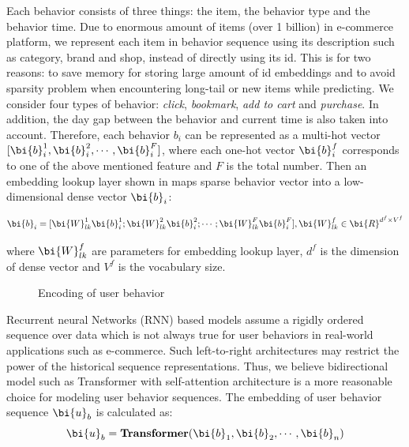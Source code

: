 \noindent
Each behavior consists of three things: the item, the behavior type and the behavior time.
Due to enormous amount of items (over 1 billion) in e-commerce platform, 
we represent each item in behavior sequence 
using its description such as category, brand and shop, instead of directly using its id.
This is for two reasons: to save memory for storing large amount of id embeddings and to avoid sparsity problem when encountering long-tail or new items while predicting.
We consider four types of behavior: \textit{click}, \textit{bookmark}, \textit{add to cart} and \textit{purchase}.
In addition, the day gap between the behavior and current time is also taken into account. 
Therefore, each behavior $b_i$ can be represented as a multi-hot vector 
$[\bi{b}_{i}^{1}, \bi{b}_{i}^{2}, \cdots, \bi{b}_{i}^{F}]$,
where each one-hot vector $\bi{b}_{i}^{f}$ corresponds to one of the above mentioned feature and $F$ is the total number.
Then an embedding lookup layer shown in  maps
sparse behavior vector into a low-dimensional dense vector  $\bi{b}_i$:

\begin{equation}
\label{eqn:lookup}
\bi{b}_i = [\bi{W}_{lk}^{1}\bi{b}_{i}^{1}; \bi{W}_{lk}^{2}\bi{b}_{i}^{2}; \cdots; \bi{W}_{lk}^{F}\bi{b}_{i}^{F}],
\bi{W}_{lk}^{f} \in \bi{R}^{d^{f} \times V^{f}} 
\end{equation}

\noindent
where $\bi{W}_{lk}^{f}$ are parameters for embedding lookup layer,
$d^{f}$ is the dimension of dense vector and $V^{f}$ is the vocabulary size.


\begin{figure}[th]
	\centering
	\caption{Encoding of user behavior}
	\label{fig:detail_2}
\end{figure}

Recurrent neural Networks (RNN) based models \cite{hochreiter1997long,cho2014properties} assume a rigidly ordered sequence over data which
is not always true for user behaviors in real-world applications such as e-commerce.
Such left-to-right architectures may restrict the power of the historical sequence representations. 
Thus, we believe bidirectional
model such as Transformer \cite{vaswani2017attention} with self-attention architecture is a more reasonable choice for modeling user behavior sequences.	
The embedding of user behavior sequence $\bi{u}_b$ is calculated as:
\begin{equation}
\bi{u}_b = \textbf{Transformer}(\bi{b}_1, \bi{b}_2, \cdots, \bi{b}_n)
\end{equation}

